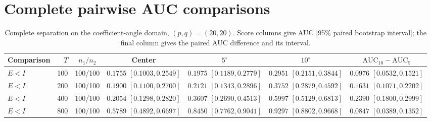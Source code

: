 \documentclass[12pt,letterpaper]{article}
\def\spacingset#1{\renewcommand{\baselinestretch}{#1}\small\normalsize}
\theoremstyle{plain}
\theoremstyle{definition}
\begin{document}
\section{Complete pairwise AUC comparisons}
\clearpage
\begin{table}[p]
\begingroup
\spacingset{1.0}
\small\centering
\caption{Complete separation on the coefficient-angle domain, $(p,q)=(20,20)$. Score columns give AUC [95\% paired bootstrap interval]; the final column gives the paired AUC difference and its interval.}
\label{s23:lambda:allauc:p20q20}
\footnotesize
\setlength{\tabcolsep}{3.5pt}
\renewcommand{\arraystretch}{1.10}
\begin{adjustbox}{max width=\linewidth}
\begin{tabular}{lrccccc}
\toprule
Comparison & $T$ & $n_1/n_2$ & Center & $5^\circ$ & $10^\circ$ & $\mathrm{AUC}_{10}-\mathrm{AUC}_{5}$\\
\midrule
$E<I$ & 100 & 100/100 & \shortstack{$0.1755$\\{\scriptsize$[0.1003,0.2549]$}} & \shortstack{$0.1975$\\{\scriptsize$[0.1189,0.2779]$}} & \shortstack{$0.2951$\\{\scriptsize$[0.2151,0.3844]$}} & \shortstack{$0.0976$\\{\scriptsize$[0.0532,0.1521]$}}\\
$E<I$ & 200 & 100/100 & \shortstack{$0.1900$\\{\scriptsize$[0.1100,0.2700]$}} & \shortstack{$0.2121$\\{\scriptsize$[0.1343,0.2896]$}} & \shortstack{$0.3752$\\{\scriptsize$[0.2879,0.4592]$}} & \shortstack{$0.1631$\\{\scriptsize$[0.1071,0.2202]$}}\\
$E<I$ & 400 & 100/100 & \shortstack{$0.2054$\\{\scriptsize$[0.1298,0.2820]$}} & \shortstack{$0.3607$\\{\scriptsize$[0.2690,0.4513]$}} & \shortstack{$0.5997$\\{\scriptsize$[0.5129,0.6813]$}} & \shortstack{$0.2390$\\{\scriptsize$[0.1800,0.2999]$}}\\
$E<I$ & 800 & 100/100 & \shortstack{$0.5789$\\{\scriptsize$[0.4892,0.6697]$}} & \shortstack{$0.8450$\\{\scriptsize$[0.7762,0.9041]$}} & \shortstack{$0.9297$\\{\scriptsize$[0.8802,0.9668]$}} & \shortstack{$0.0847$\\{\scriptsize$[0.0389,0.1352]$}}\\

\end{tabular}
\end{adjustbox}
\end{table}
\end{document}
